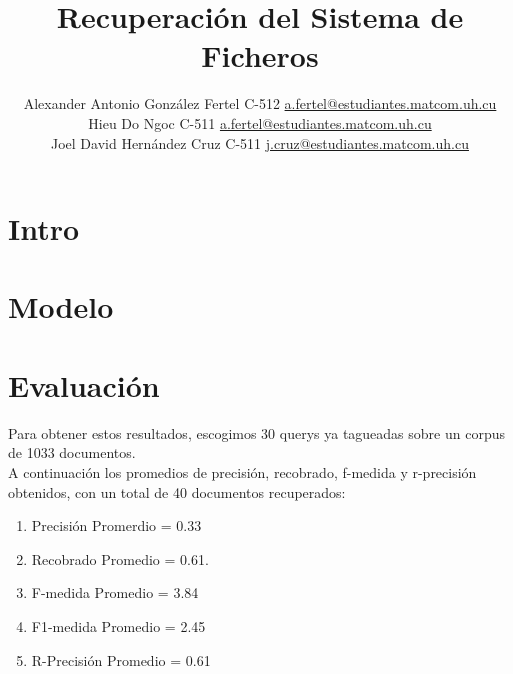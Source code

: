\documentclass[a4paper, 10pt]{article}
\title{Recuperación del Sistema de Ficheros}
\author{Alexander Antonio González Fertel C-512 \hfill
		\href{mailto:a.fertel@estudiantes.matcom.uh.cu}{a.fertel@estudiantes.matcom.uh.cu}\\
		Hieu Do Ngoc C-511 \hfill
		\href{mailto:a.fertel@estudiantes.matcom.uh.cu}{a.fertel@estudiantes.matcom.uh.cu}\\
		Joel David Hernández Cruz C-511 \hfill
		\href{mailto:j.cruz@estudiantes.matcom.uh.cu}{j.cruz@estudiantes.matcom.uh.cu}}
\date{}
\begin{document}
	\maketitle

	\section{Intro}
	
	\section{Modelo}

	\section{Evaluación}
	Para obtener estos resultados, escogimos 30 querys ya tagueadas sobre un corpus de 1033 documentos.\\ A continuación los promedios de precisión, recobrado, f-medida y r-precisión obtenidos, con un total de 40 documentos recuperados:
	\begin{enumerate}
       \item Precisión Promerdio = 0.33
        \item Recobrado Promedio = 0.61.
        \item F-medida Promedio = 3.84
        \item F1-medida Promedio = 2.45
        \item R-Precisión Promedio = 0.61

    \end{enumerate}
\end{document}
